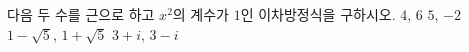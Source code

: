 다음 두 수를 근으로 하고 $x^2$의 계수가 $1$인 이차방정식을 구하시오.
 $4$, $6$
 $5$, $-2$
 $1-\sqrt{5}$, $1+\sqrt{5}$
 $3+i$, $3-i$ 
